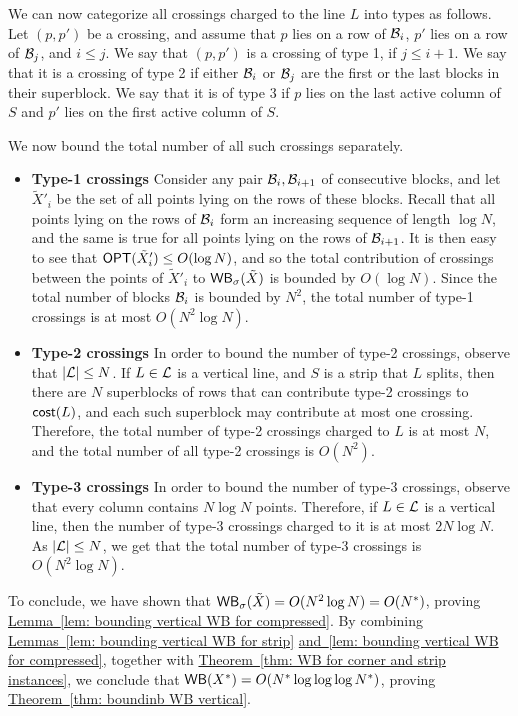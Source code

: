 \documentclass[11pt]{article}
\numberwithin{equation}{section}
\theoremstyle{definition}
\theoremstyle{plain}
\newcommand{\expref}[2]{\hyperref[#2]{#1~\ref{#2}}}
\begin{document}
We can now categorize all crossings charged to the line $L$ into types as follows. Let $(p,p')$ be a crossing, and assume that $p$ lies on a row of ${\mathcal{B}}_i$, $p'$ lies on a row of ${\mathcal{B}}_j$, and $i\leq j$. We say that $(p,p')$ is a crossing of type 1, if $j\leq i+1$. We say that 
it is a crossing of type 2 if either ${\mathcal{B}}_i$ or ${\mathcal{B}}_j$ are the first or the last blocks in their superblock. We say that it is of type 3 if $p$ lies on the last active column of $S$ and $p'$ lies on the first active column of $S$.

We now bound the total number of all such crossings separately.

\begin{itemize}
    \item {\bf Type-1 crossings}
Consider any pair ${\mathcal{B}}_i,{\mathcal{B}}_{i+1}$ of consecutive blocks, and let $\tilde X'_i$ be the set of all points lying on the rows of these blocks. Recall that all points lying on the rows of ${\mathcal{B}}_i$ form an increasing sequence of length $\log N$, and the same is true for all points lying on the rows of ${\mathcal{B}}_{i+1}$. It is then easy to see that $\mbox{\sf OPT}(\tilde X'_i)\leq O(\log N)$, and so the total contribution of crossings between the points of $\tilde X'_i$ to $\mathsf{WB}_{\sigma}(\tilde X)$ is bounded by $O(\log N)$. Since the total number of blocks ${\mathcal{B}}_i$ is bounded by $N^2$, the total number of type-1 crossings is at most $O(N^2\log N)$.

\item {\bf Type-2 crossings}
In order to bound the number of type-2 crossings, observe that $|{\mathcal L}|\leq N$. If $L\in {\mathcal L}$ is a vertical line, and $S$ is a strip that $L$ splits, then there are $N$ superblocks of rows that can contribute type-2 crossings to $\mathsf{cost}(L)$, and each such superblock may contribute at most one crossing. Therefore, the total number of type-2 crossings charged to $L$ is at most $N$, and the total number of all type-2 crossings is $O(N^2)$.

\item {\bf Type-3 crossings}
In order to bound the number of type-3 crossings, observe that every column contains $N\log N$ points. Therefore, if $L\in {\mathcal L}$ is a vertical line, then the number of type-3 crossings charged to it is at most $2N\log N$. As $|{\mathcal L}|\leq N$, we get that the total number of type-3 crossings is $O(N^2\log N)$.

\end{itemize}



To conclude, we have shown that $\mathsf{WB}_{\sigma}(\tilde X)=O(N^2\log N)=O(N^*)$, proving \expref{Lemma}{lem: bounding vertical WB for compressed}. By combining \expref{Lemmas}{lem: bounding vertical WB for strip} \expref{and}{lem: bounding vertical WB for compressed}, together with \expref{Theorem}{thm: WB for corner and strip instances}, we conclude that $\mathsf{WB}(X^*)=O(N^*\log\log\log N^*)$, proving \expref{Theorem}{thm: boundinb WB vertical}.
\end{document}
